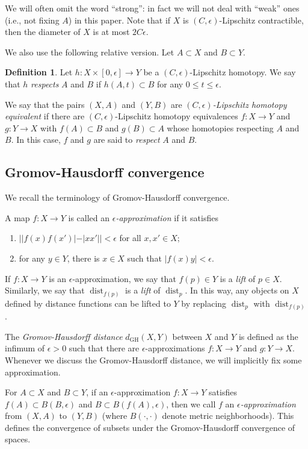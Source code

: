 \documentclass[a4paper,12pt]{amsart}
\theoremstyle{plain}
\theoremstyle{definition}
\newtheorem{dfn}[thm]{Definition}
\numberwithin{thm}{section}
\numberwithin{equation}{section}
\DeclareMathOperator{\dist}{dist}
\begin{document}
We will often omit the word ``strong'': in fact we will not deal with ``weak'' ones (i.e., not fixing $A$) in this paper.
Note that if $X$ is $(C,\epsilon)$-Lipschitz contractible, then the diameter of $X$ is at most $2C\epsilon$.

We also use the following relative version.
Let $A\subset X$ and $B\subset Y$.

\begin{dfn}
Let $h:X \times [0,\epsilon] \to Y$ be a $(C,\epsilon)$-Lipschitz homotopy.
We say that $h$ \textit{respects} $A$ and $B$ if $h(A,t)\subset B$ for any $0\le t\le\epsilon$.

We say that the pairs $(X,A)$ and $(Y,B)$ are {\it $(C,\epsilon)$-Lipschitz homotopy equivalent} if there are $(C,\epsilon)$-Lipschitz homotopy equivalences $f:X\to Y$ and $g:Y\to X$ with $f(A)\subset B$ and $g(B)\subset A$ whose homotopies respecting $A$ and $B$.
In this case, $f$ and $g$ are said to \textit{respect} $A$ and $B$.
\end{dfn}

\subsection{Gromov-Hausdorff convergence}
We recall the terminology of Gromov-Hausdorff convergence.

A map $f:X\to Y$ is called an \textit{$\epsilon$-approximation} if it satisfies
\begin{enumerate}
\item $||f(x)f(x')| - |xx'||<\epsilon$ for all $x,x'\in X$; 
\item for any $y\in Y$, there is $x\in X$ such that $|f(x)y|<\epsilon$.
\end{enumerate}

If $f:X\to Y$ is an $\epsilon$-approximation, we say that $f(p)\in Y$ is a \textit{lift} of $p\in X$.
Similarly, we say that $\dist_{f(p)}$ is a \textit{lift} of $\dist_p$.
In this way, any objects on $X$ defined by distance functions can be lifted to $Y$ by replacing $\dist_p$ with $\dist_{f(p)}$.

The \textit{Gromov-Hausdorff distance} $d_\mathrm{GH}(X,Y)$ between $X$ and $Y$ is defined as the infimum of $\epsilon>0$ such that there are $\epsilon$-approximations $f:X\to Y$ and $g:Y\to X$.
Whenever we discuss the Gromov-Hausdorff distance, we will implicitly fix some approximation.

For $A\subset X$ and $B\subset Y$, if an $\epsilon$-approximation $f:X\to Y$ satisfies $f(A)\subset B(B,\epsilon)$ and $B\subset B(f(A),\epsilon)$, then we call $f$ an \textit{$\epsilon$-approximation} from $(X,A)$ to $(Y,B)$ (where $B(\cdot,\cdot)$ denote metric neighborhoods).
This defines the convergence of subsets under the Gromov-Hausdorff convergence of spaces.
\end{document}
